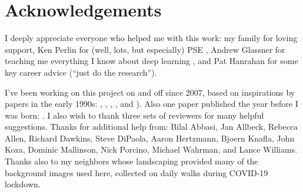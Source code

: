 \documentclass[letterpaper]{article}
\begin{document}

\section{Acknowledgements}
I deeply appreciate everyone who helped me with this work: my family for loving support, Ken Perlin for (well, lots, but especially) PSE \citep{perlin_image_1985}, Andrew Glassner for teaching me everything I know about deep learning \citep{glassner_deep_2021}, and Pat Hanrahan for some key career advice (“just do the research”).
\par
I've been working on this project on and off since 2007, based on inspirations by papers in the early 1990s: \citet{witkin_reaction_1991}, \citet{turk_generating_1991}, \citet{angeline_competitive_1993}, \citet{sims_artificial_1991}, and \citet{sims_evolving_1994}). Also one paper published the year before I was born: \citet{turing_chemical_1952}.
I also wish to thank three sets of reviewers for many helpful suggestions.
Thanks for additional help from:
Bilal Abbasi,
Jan Allbeck,
Rebecca Allen,
Richard Dawkins,
Steve DiPaola,
Aaron Hertzmann,
Bjoern Knafla,
John Koza,
Dominic Mallinson,
Nick Porcino,
Michael Wahrman,
and Lance Williams.
Thanks also to my neighbors whose landscaping provided many of the background images used here, collected on daily walks during COVID-19 lockdown.
\par











\appendix
\onecolumn
\end{document}
